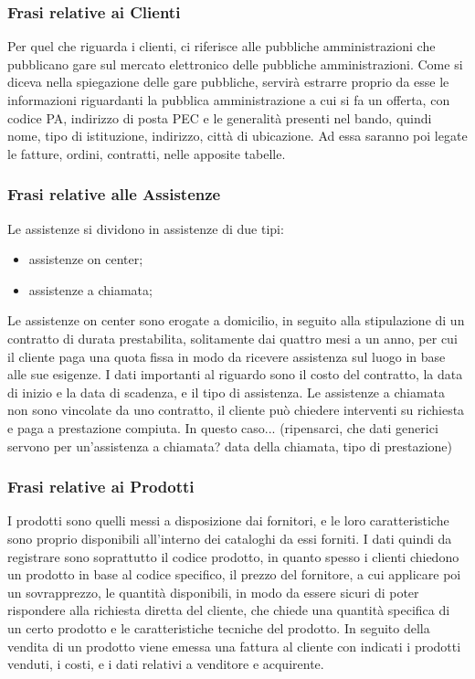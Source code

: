 \subsubsection{Frasi relative ai Clienti}
Per quel che riguarda i clienti, ci riferisce alle pubbliche amministrazioni che pubblicano gare sul mercato elettronico delle pubbliche amministrazioni. Come si diceva nella spiegazione delle gare pubbliche, servirà estrarre proprio da esse le informazioni riguardanti la pubblica amministrazione a cui si fa un offerta, con codice PA, indirizzo di posta PEC e le generalità presenti nel bando, quindi nome, tipo di istituzione, indirizzo, città di ubicazione.\newline
Ad essa saranno poi legate le fatture, ordini, contratti, nelle apposite tabelle.

\subsubsection{Frasi relative alle Assistenze}
Le assistenze si dividono in assistenze di due tipi:
\begin{itemize}
\item	assistenze on center;
\item	assistenze a chiamata;
\end{itemize}
Le assistenze on center sono erogate a domicilio, in seguito alla stipulazione di un contratto di durata prestabilita, solitamente dai quattro mesi a un anno, per cui il cliente paga una quota fissa in modo da ricevere assistenza sul luogo in base alle sue esigenze.\newline
I dati importanti al riguardo sono il costo del contratto, la data di inizio e la data di scadenza, e il tipo di assistenza.\newline
Le assistenze a chiamata non sono vincolate da uno contratto, il cliente può chiedere interventi su richiesta e paga a prestazione compiuta.
In questo caso... (ripensarci, che dati generici servono per un'assistenza a chiamata? data della chiamata, tipo di prestazione)


\subsubsection{Frasi relative ai Prodotti}
I prodotti sono quelli messi a disposizione dai fornitori, e le loro caratteristiche sono proprio disponibili all'interno dei cataloghi da essi forniti. I dati quindi da registrare sono soprattutto il codice prodotto, in quanto spesso i clienti chiedono un prodotto in base al codice specifico, il prezzo del fornitore, a cui applicare poi un sovrapprezzo, le quantità disponibili, in modo da essere sicuri di poter rispondere alla richiesta diretta del cliente, che chiede una quantità specifica di un certo prodotto e le caratteristiche tecniche del prodotto.\newline
In seguito della vendita di un prodotto viene emessa una fattura al cliente con indicati i prodotti venduti, i costi, e i dati relativi a venditore e acquirente.

